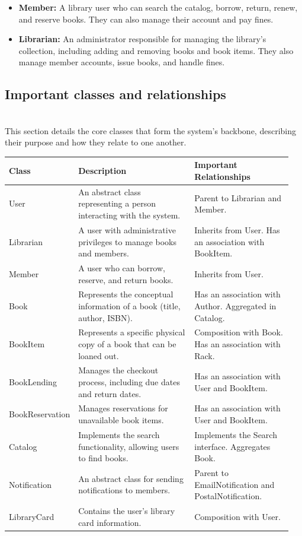 \begin{itemize}
\item
\protect{}\label{bTz_RRhzEs3skV70Qahm8}
\textbf{Member:} A library user who can search the catalog, borrow, return, renew, and reserve books. They can also manage their account and pay fines.
\item
\protect{}\label{SgibUDA_5KPm-i9_T9d7V}
\textbf{Librarian:} An administrator responsible for managing the library's collection, including adding and removing books and book items. They also manage member accounts, issue books, and handle fines.
\end{itemize}

\subsection{Important classes and relationships}\label{zGgQngxslL8UdXx-j_Jy6}
\\
This section details the core classes that form the system's backbone, describing their purpose and how they relate to one another.

\begin{center}
\begin{tabular}{|p{0.18\linewidth}|p{0.42\linewidth}|p{0.35\linewidth}|}
\hline
\textbf{Class} & \textbf{Description} & \textbf{Important Relationships} \\
\hline
User & An abstract class representing a person interacting with the system. & Parent to Librarian and Member. \\
\hline
Librarian & A user with administrative privileges to manage books and members. & Inherits from User. Has an association with BookItem. \\
\hline
Member & A user who can borrow, reserve, and return books. & Inherits from User. \\
\hline
Book & Represents the conceptual information of a book (title, author, ISBN). & Has an association with Author. Aggregated in Catalog. \\
\hline
BookItem & Represents a specific physical copy of a book that can be loaned out. & Composition with Book. Has an association with Rack. \\
\hline
BookLending & Manages the checkout process, including due dates and return dates. & Has an association with User and BookItem. \\
\hline
BookReservation & Manages reservations for unavailable book items. & Has an association with User and BookItem. \\
\hline
Catalog & Implements the search functionality, allowing users to find books. & Implements the Search interface. Aggregates Book. \\
\hline
Notification & An abstract class for sending notifications to members. & Parent to EmailNotification and PostalNotification. \\
\hline
LibraryCard & Contains the user’s library card information. & Composition with User. \\
\hline
\end{tabular}
\end{center}


